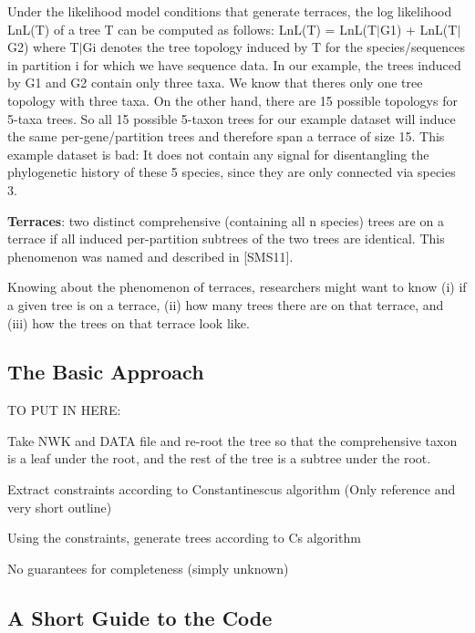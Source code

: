 Under the likelihood model conditions that generate terraces, the log likelihood Ln\+L(\+T) of a tree T can be computed as follows\+: Ln\+L(\+T) = LnL(T$\vert$\+G1) + LnL(T$\vert$\+G2) where T$\vert$\+Gi denotes the tree topology induced by T for the species/sequences in partition i for which we have sequence data. In our example, the trees induced by G1 and G2 contain only three taxa. We know that there\textquotesingle{}s only one tree topology with three taxa. On the other hand, there are 15 possible topologys for 5-\/taxa trees. So all 15 possible 5-\/taxon trees for our example dataset will induce the same per-\/gene/partition trees and therefore span a terrace of size 15. This example dataset is bad\+: It does not contain any signal for disentangling the phylogenetic history of these 5 species, since they are only connected via species 3.

{\bfseries Terraces}\+: two distinct comprehensive (containing all n species) trees are on a terrace if all induced per-\/partition subtrees of the two trees are identical. This phenomenon was named and described in \mbox{[}S\+M\+S11\mbox{]}.

Knowing about the phenomenon of terraces, researchers might want to know (i) if a given tree is on a terrace, (ii) how many trees there are on that terrace, and (iii) how the trees on that terrace look like.

\subsection*{The Basic Approach}

TO P\+UT IN H\+E\+RE\+:
\begin{DoxyItemize}
\item Take N\+WK and D\+A\+TA file and re-\/root the tree so that the comprehensive taxon is a leaf under the root, and the rest of the tree is a subtree under the root.
\item Extract constraints according to Constantinescu\textquotesingle{}s algorithm (Only reference and very short outline)
\item Using the constraints, generate trees according to C\textquotesingle{}s algorithm
\item No guarantees for completeness (simply unknown)
\end{DoxyItemize}

\subsection*{A Short Guide to the Code}

